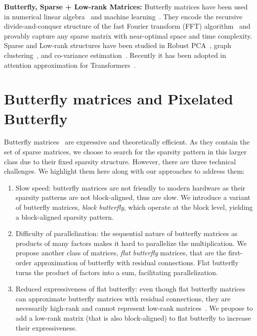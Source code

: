 \textbf{Butterfly, Sparse + Low-rank Matrices:} Butterfly matrices have been used in numerical linear algebra~\citep{parker1995random, li2015butterfly} and machine learning~\citep{mathieu2014fast, jing2017tunable, munkhoeva2018quadrature, dao2019learning, choromanski2019unifying}. They encode the recursive divide-and-conquer structure of the fast Fourier transform (FFT) algorithm~\citep{cooley1965algorithm} and provably capture any sparse matrix with near-optimal space and time complexity. Sparse and Low-rank structures have been studied in Robust PCA~\citep{candes2011robust}, graph clustering~\citep{jalali2011clustering}, and co-variance estimation~\citep{luo2011high}. Recently it has been adopted in attention approximation for Transformers~\citep{scatterbrain}. 

\section{Butterfly matrices and Pixelated Butterfly}
\label{sec:butterfly}

Butterfly matrices~\citep{parker1995random, dao2019learning} are expressive and theoretically efficient. As they contain the set of sparse matrices, we choose to search for the sparsity pattern in this larger class due to their fixed sparsity structure. However, there are three technical challenges. We highlight them here along with our approaches to address them:

\begin{enumerate}[leftmargin=*,nosep,nolistsep]
  \item Slow speed: butterfly matrices are not friendly to modern hardware as their sparsity patterns are not block-aligned, thus are slow. We introduce a variant of butterfly matrices, \emph{block butterfly}, which operate at the block level, yielding a block-aligned sparsity pattern.
  \item Difficulty of parallelization: the sequential nature of butterfly matrices as products of many factors makes it hard to parallelize the multiplication. We propose another class of matrices, \emph{flat butterfly} matrices, that are the first-order approximation of butterfly with residual connections. Flat butterfly turns the product of factors into a sum, facilitating parallelization.
  \item Reduced expressiveness of flat butterfly: even though flat butterfly matrices can approximate butterfly matrices with residual connections, they are necessarily high-rank and cannot represent low-rank matrices~\citep{udell2019big}. We propose to add a low-rank matrix (that is also block-aligned) to flat butterfly to increase their expressiveness.
\end{enumerate}

